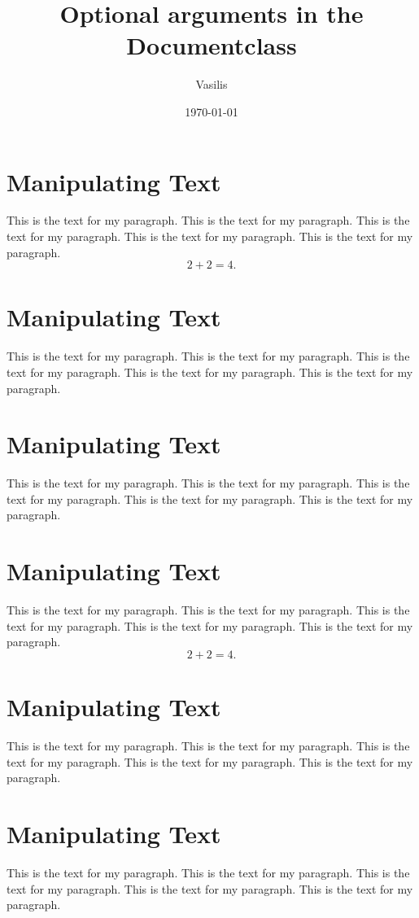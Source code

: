 \documentclass[12pt, fleqn, leqno, twocolumn, landscape]{article}
\title{Optional arguments in the Documentclass}
\author{Vasilis}
\date{\today}
\begin{document}
\maketitle

\section{Manipulating Text}
This is the text for my paragraph. This is the text for my paragraph. This is the text for my paragraph. This is the text for my paragraph. This is the text for my paragraph. 
\begin{equation}
	2 + 2 = 4.
\end{equation}

\section{Manipulating Text}
This is the text for my paragraph. This is the text for my paragraph. This is the text for my paragraph. This is the text for my paragraph. This is the text for my paragraph. 

\section{Manipulating Text}
This is the text for my paragraph. This is the text for my paragraph. This is the text for my paragraph. This is the text for my paragraph. This is the text for my paragraph. 

\section{Manipulating Text}
This is the text for my paragraph. This is the text for my paragraph. This is the text for my paragraph. This is the text for my paragraph. This is the text for my paragraph. 
\begin{equation}
	2 + 2 = 4.
\end{equation}

\section{Manipulating Text}
This is the text for my paragraph. This is the text for my paragraph. This is the text for my paragraph. This is the text for my paragraph. This is the text for my paragraph. 

\section{Manipulating Text}
This is the text for my paragraph. This is the text for my paragraph. This is the text for my paragraph. This is the text for my paragraph. This is the text for my paragraph. 
\end{document}
